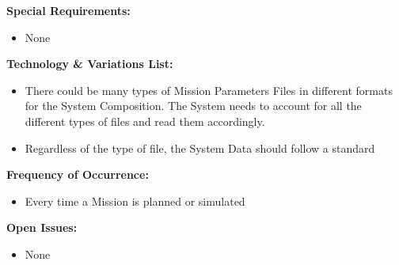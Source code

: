 \documentclass[letterpaper]{article}
\begin{document}
\textbf{Special Requirements:}
\begin{itemize}
   \item None
\end{itemize}
\textbf{Technology \& Variations List:}
\begin{itemize}
   \item There could be many types of Mission Parameters Files in
      different formats for the System Composition.  The System needs
      to account for all the different types of files and read them
      accordingly.
   \item Regardless of the type of file, the System Data should follow
      a standard
\end{itemize}
\textbf{Frequency of Occurrence:}
\begin{itemize}
   \item Every time a Mission is planned or simulated
\end{itemize}
\textbf{Open Issues:}
\begin{itemize}
   \item None
\end{itemize}
\end{document}
